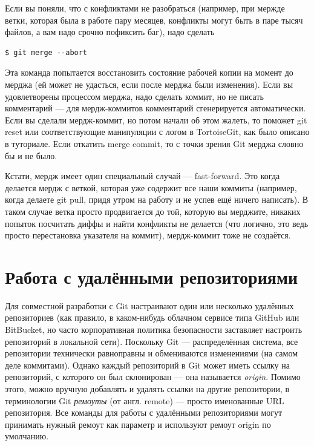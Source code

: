 \documentclass{../text-style}
\begin{document}
Если вы поняли, что с конфликтами не разобраться (например, при мержде ветки, которая была в работе пару месяцев, конфликты могут быть в паре тысяч файлов, а вам надо срочно пофиксить баг), надо сделать 

\begin{verbatim}
$ git merge --abort
\end{verbatim}

Эта команда попытается восстановить состояние рабочей копии на момент до мерджа (ей может не удасться, если после мерджа были изменения). Если вы удовлетворены процессом мерджа, надо сделать коммит, но не писать комментарий --- для мердж-коммитов комментарий сгенерируется автоматически. Если вы сделали мердж-коммит, но потом начали об этом жалеть, то поможет git reset или соответствующие манипуляции с логом в TortoiseGit, как было описано в туториале. Если откатить merge commit, то с точки зрения Git мерджа словно бы и не было.

Кстати, мердж имеет один специальный случай --- fast-forward. Это когда делается мердж с веткой, которая уже содержит все наши коммиты (например, когда делаете git pull, придя утром на работу и не успев ещё ничего написать). В таком случае ветка просто продвигается до той, которую вы мерджите, никаких попыток посчитать диффы и найти конфликты не делается (что логично, это ведь просто перестановка указателя на коммит), мердж-коммит тоже не создаётся.

\section{Работа с удалёнными репозиториями}

Для совместной разработки с Git настраивают один или несколько удалённых репозиториев (как правило, в каком-нибудь облачном сервисе типа GitHub или BitBucket, но часто корпоративная политика безопасности заставляет настроить репозиторий в локальной сети). Поскольку Git --- распределённая система, все репозитории технически равноправны и обмениваются изменениями (на самом деле коммитами). Однако каждый репозиторий в Git может иметь ссылку на репозиторий, с которого он был склонирован --- она называется \emph{origin}. Помимо этого, можно вручную добавлять и удалять ссылки на другие репозитории, в терминологии Git \emph{ремоуты} (от англ. remote) --- просто именованные URL репозитория. Все команды для работы с удалёнными репозиториями могут принимать нужный ремоут как параметр и используют ремоут origin по умолчанию.
\end{document}
